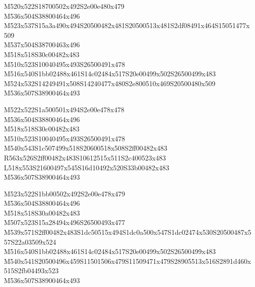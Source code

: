 \documentclass{article}
\begin{document}
\begin{multicols}{5}
\begin{center}

M520x522S18700502x492S2e00e480x479 %
\\M536x504S38800464x496 %
\\M523x537S15a3a490x494S20500482x481S20500513x481S2df08491x464S15051477x509 %
\\M537x504S38700463x496 %
\\M518x518S30c00482x483 %
\\M510x523S10040495x493S26500491x478 %
\\M516x540S1bb02488x461S14c02484x517S20e00499x502S26500499x483 %
\\M524x532S14249491x508S14240477x480S2e800510x469S20500480x509 %
\\M536x507S38900464x493 %
\vfil
\columnbreak

M522x522S1a500501x494S2e00e478x478 %
\\M536x504S38800464x496 %
\\M518x518S30c00482x483 %
\\M510x523S10040495x493S26500491x478 %
\\M540x543S1c507499x518S20600518x508S2ff00482x483 %
\\R563x526S2ff00482x483S10612515x511S2c400523x483 %
\\L518x553S21600497x545S16d10492x520S33b00482x483 %
\\M536x507S38900464x493 %
\vfil
\columnbreak

M523x522S1bb00502x492S2e00e478x479 %
\\M536x504S38800464x496 %
\\M518x518S30a00482x483 %
\\M507x523S15a28494x496S26500493x477 %
\\M539x571S2ff00482x483S1dc50515x494S1dc0a500x547S1dc02474x530S20500487x557S22a03509x524 %
\\M516x540S1bb02488x461S14c02484x517S20e00499x502S26500499x483 %
\\M540x541S20500496x459S11501506x479S11509471x479S28905513x516S2891d460x515S2fb04493x523 %
\\M536x507S38900464x493 %
\vfil
\columnbreak


\end{center}
\end{multicols}
\end{document}

